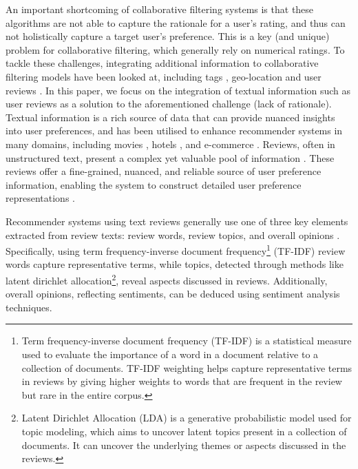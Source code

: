 An important shortcoming of collaborative filtering systems is that these algorithms are not able to capture the rationale for a user’s rating, and thus can not holistically capture a target user’s preference. This is a key (and unique) problem for collaborative filtering, which generally rely on numerical ratings. To tackle these challenges, integrating additional information to collaborative filtering models have been looked at, including tags \cite{zhou2003learning}, geo-location \cite{hu2014your} and user reviews \cite{srifi2020recommender}. In this paper, we focus on the integration of textual information such as user reviews as a solution to the aforementioned challenge (lack of rationale). Textual information is a rich source of data that can provide nuanced insights into user preferences, and has been utilised to enhance recommender systems in many domains, including movies \cite{diao2014jointly}, hotels \cite{musat2013recommendation}, and e-commerce \cite{he2016ups}. Reviews, often in unstructured text, present a complex yet valuable pool of information \cite{shoja2019customer}. These reviews offer a fine-grained, nuanced, and reliable source of user preference information, enabling the system to construct detailed user preference representations \cite{zhang2014urcf}. 

Recommender systems using text reviews generally use one of three  key elements extracted from review texts: review words, review topics, and overall opinions \cite{chen2015augmenting}. Specifically, using term frequency-inverse document frequency\footnote{Term frequency-inverse document frequency (TF-IDF) is a statistical measure used to evaluate the importance of a word in a document relative to a collection of documents.  TF-IDF weighting helps capture representative terms in reviews by giving higher weights to words that are frequent in the review but rare in the entire corpus.} (TF-IDF) review words capture representative terms, while topics, detected through methods like latent dirichlet allocation\footnote{Latent Dirichlet Allocation (LDA) is a generative probabilistic model used for topic modeling, which aims to uncover latent topics present in a collection of documents. It can uncover the underlying themes or aspects discussed in the reviews.}, reveal aspects discussed in reviews. Additionally, overall opinions, reflecting sentiments, can be deduced using sentiment analysis techniques. 

